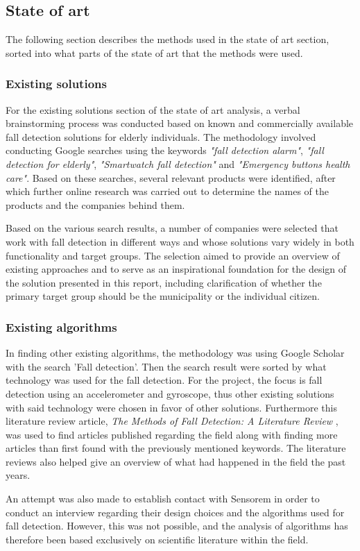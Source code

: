\subsection{State of art}

The following section describes the methods used in the state of art section, sorted into what parts of the state of art that the methods were used. 

\subsubsection{Existing solutions}
For the existing solutions section of the state of art analysis, a verbal brainstorming process was conducted based on known and commercially available fall detection solutions for elderly individuals. The methodology involved conducting Google searches using the keywords \textit{"fall detection alarm"}, \textit{"fall detection for elderly"}, \textit{"Smartwatch fall detection"} and \textit{"Emergency buttons health care"}. Based on these searches, several relevant products were identified, after which further online research was carried out to determine the names of the products and the companies behind them.

Based on the various search results, a number of companies were selected that work with fall detection in different ways and whose solutions vary widely in both functionality and target groups. The selection aimed to provide an overview of existing approaches and to serve as an inspirational foundation for the design of the solution presented in this report, including clarification of whether the primary target group should be the municipality or the individual citizen.

\subsubsection{Existing algorithms}
In finding other existing algorithms, the methodology was using Google Scholar with the search 'Fall detection'. Then the search result were sorted by what technology was used for the fall detection. For the project, the focus is fall detection using an accelerometer and gyroscope, thus other existing solutions with said technology were chosen in favor of other solutions. Furthermore this literature review article, \textit{The Methods of Fall Detection: A Literature Review} \cite{newaz_methods_2023}, was used to find articles published regarding the field along with finding more articles than first found with the previously mentioned keywords. The literature reviews also helped give an overview of what had happened in the field the past years.

An attempt was also made to establish contact with Sensorem in order to conduct an interview regarding their design choices and the algorithms used for fall detection. However, this was not possible, and the analysis of algorithms has therefore been based exclusively on scientific literature within the field.